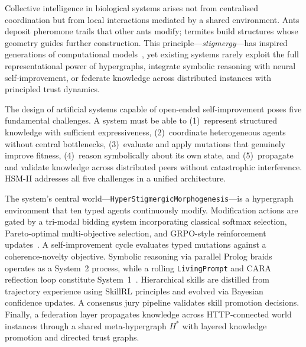 \documentclass[11pt]{article}
\begin{document}
Collective intelligence in biological systems arises not from centralised
coordination but from local interactions mediated by a shared environment.
Ants deposit pheromone trails that other ants modify; termites build structures
whose geometry guides further construction. This principle---\emph{stigmergy}---has
inspired generations of computational models~\cite{grasse1959,dorigo1996}, yet
existing systems rarely exploit the full representational power of hypergraphs,
integrate symbolic reasoning with neural self-improvement, or federate knowledge
across distributed instances with principled trust dynamics.

The design of artificial systems capable of open-ended self-improvement poses five
fundamental challenges. A system must be able to (1)~represent structured knowledge
with sufficient expressiveness, (2)~coordinate heterogeneous agents without central
bottlenecks, (3)~evaluate and apply mutations that genuinely improve fitness,
(4)~reason symbolically about its own state, and (5)~propagate and validate
knowledge across distributed peers without catastrophic interference. HSM-II
addresses all five challenges in a unified architecture.

The system's central world---\texttt{HyperStigmergicMorphogenesis}---is a
hypergraph environment that ten typed agents continuously modify. Modification
actions are gated by a tri-modal bidding system incorporating classical softmax
selection, Pareto-optimal multi-objective selection, and GRPO-style reinforcement
updates~\cite{shao2024grpo}. A self-improvement cycle evaluates typed mutations
against a coherence-novelty objective. Symbolic reasoning via parallel Prolog
braids operates as a System~2 process, while a rolling \texttt{LivingPrompt} and
CARA reflection loop constitute System~1~\cite{latimer2025cara}. Hierarchical
skills are distilled from trajectory experience using SkillRL principles and evolved
via Bayesian confidence updates. A consensus jury pipeline validates skill promotion
decisions. Finally, a federation layer propagates knowledge across HTTP-connected
world instances through a shared meta-hypergraph $H^*$ with layered knowledge
promotion and directed trust graphs.
\end{document}
